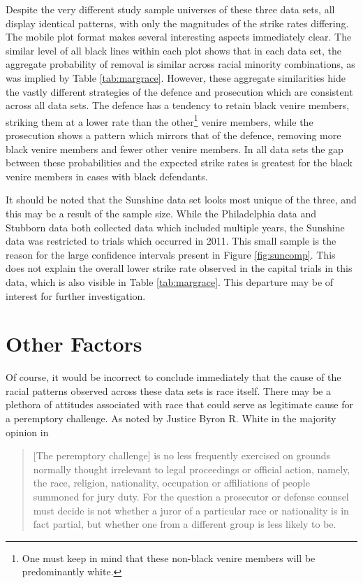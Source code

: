 Despite the very different study sample universes of these three data sets, all display identical patterns, with only the
magnitudes of the strike rates differing. The mobile plot format makes several interesting aspects immediately
clear. The similar level of all black lines within each plot shows that in each data set, the aggregate probability of removal is
similar across racial minority combinations, as was implied by Table \ref{tab:margrace}. However, these aggregate similarities
hide the vastly different strategies of the defence and prosecution which are consistent across all data sets. The defence has a
tendency to retain black venire members, striking them at a lower rate
than the other\footnote{One must keep in mind that these non-black
  venire members will be predominantly white.} venire members, while the
prosecution shows a pattern which mirrors that of the defence,
removing more black venire members and fewer other venire members. In
all data sets the gap between these probabilities and the expected strike rates is greatest for the black venire members in cases
with black defendants.

It should be noted that the Sunshine data set looks most unique of the three, and this may be a result of the sample size. While
the Philadelphia data and Stubborn data both collected data which included multiple years, the Sunshine data was restricted to
trials which occurred in 2011. This small sample is the reason for the large confidence intervals present in Figure
\ref{fig:suncomp}. This does not explain the overall lower strike rate observed in the capital trials in this data, which is also
visible in Table \ref{tab:margrace}. This departure may be of interest for further investigation.

\section{Other Factors} \label{sec:otherfact}

Of course, it would be incorrect to conclude immediately that the cause of the racial patterns observed across these data sets is
race itself. There may be a plethora of attitudes associated with race that could serve as legitimate cause for a peremptory
challenge. As noted by Justice Byron R. White in the majority opinion in \cite{swainvalabama}

\begin{quote}
  [The peremptory challenge] is no less frequently exercised on grounds normally thought irrelevant to legal proceedings or
  official action, namely, the race, religion, nationality, occupation or affiliations of people summoned for jury duty. For the
  question a prosecutor or defense counsel must decide is not whether a juror of a particular race or nationality is in fact
  partial, but whether one from a different group is less likely to be.
\end{quote}

